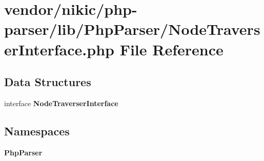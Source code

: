 \section{vendor/nikic/php-\/parser/lib/\+Php\+Parser/\+Node\+Traverser\+Interface.php File Reference}
\label{_node_traverser_interface_8php}
\subsection*{Data Structures}
\begin{DoxyCompactItemize}
\item 
interface {\bf Node\+Traverser\+Interface}
\end{DoxyCompactItemize}
\subsection*{Namespaces}
\begin{DoxyCompactItemize}
\item 
 {\bf Php\+Parser}
\end{DoxyCompactItemize}
